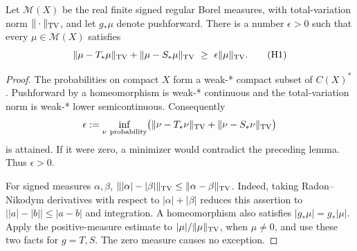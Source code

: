 \begin{lemma}\ours
Let \(\mathcal M(X)\) be the real finite signed regular Borel measures, with
total-variation norm \(\|\cdot\|_{\rm TV}\), and let \(g_*\mu\) denote
pushforward. There is a number \(\epsilon>0\) such that every
\(\mu\in\mathcal M(X)\) satisfies
\[
 \|\mu-T_*\mu\|_{\rm TV}+\|\mu-S_*\mu\|_{\rm TV}
 \ \geq\ \epsilon\|\mu\|_{\rm TV}.
 \tag{H1}
\]
\end{lemma}
\begin{proof}
The probabilities on compact \(X\) form a weak-* compact subset of
\(C(X)^*\). Pushforward by a homeomorphism is weak-* continuous and the
total-variation norm is weak-* lower semicontinuous. Consequently
\[
 \epsilon:=\inf_{\nu\ \mathrm{probability}}
 \bigl(\|\nu-T_*\nu\|_{\rm TV}+\|\nu-S_*\nu\|_{\rm TV}\bigr)
\]
is attained. If it were zero, a minimizer would contradict the preceding
lemma. Thus \(\epsilon>0\).

For signed measures \(\alpha,\beta\),
\(\||\alpha|-|\beta|\|_{\rm TV}\leq\|\alpha-\beta\|_{\rm TV}\).
Indeed, taking Radon--Nikodym derivatives with respect to
\(|\alpha|+|\beta|\) reduces this assertion to
\(\bigl||a|-|b|\bigr|\leq|a-b|\) and integration. A homeomorphism also
satisfies \(|g_*\mu|=g_*|\mu|\). Apply the positive-measure estimate to
\(|\mu|/\|\mu\|_{\rm TV}\), when \(\mu\ne0\), and use these two facts
for \(g=T,S\). The zero measure causes no exception.
\end{proof}

